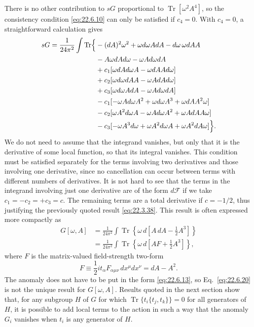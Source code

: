 There is no other contribution to $sG$ proportional to
$\operatorname{Tr}[\omega^2A^4]$, so the consistency condition
\eqref{eq:22.6.10} can only be satisfied if $c_4=0$. With $c_4=0$, a
straightforward calculation gives
\[
 \begin{aligned}
 sG=\frac{1}{24\pi^2}\int\operatorname{Tr}\Bigl\{
 &-(dA)^2\omega^2+\omega d\omega A dA-d\omega\,\omega dA A
 \\
 &-A\omega dA d\omega-\omega A d\omega dA
 \\
 &+c_1[\omega dA d\omega A-\omega dA A d\omega]
 \\
 &+c_2[\omega d\omega dA A-\omega A dA d\omega]
 \\
 &+c_3[\omega d\omega A dA-\omega A d\omega dA]
 \\
 &-c_1[-\omega A d\omega A^2+\omega d\omega A^3
       +\omega dA A^2\omega]
 \\
 &-c_2[\omega A^2d\omega A-\omega A d\omega A^2
       +\omega A dA A\omega]
 \\
 &-c_3[-\omega A^3d\omega+\omega A^2d\omega A
       +\omega A^2dA\omega]\Bigr\}.
 \end{aligned}
\]
We do not need to assume that the integrand vanishes, but only that it is
the derivative of some local function, so that its integral vanishes. This
condition must be satisfied separately for the terms involving two
derivatives and those involving one derivative, since no cancellation can
occur between terms with different numbers of derivatives. It is not hard
to see that the terms in the integrand involving just one derivative are
of the form $d\mathcal F$ if we take
$c_1=-c_2=+c_3=c$. The remaining terms are a total derivative if
$c=-1/2$, thus justifying the previously quoted result
\eqref{eq:22.3.38}. This result is often expressed more compactly as
\begin{equation}
 \begin{aligned}
 G[\omega,A]
 &=\frac{1}{24\pi^2}\int
 \operatorname{Tr}\left\{\omega\,d\left[
 A\,dA-\frac12A^3\right]\right\}
 \\
 &=\frac{1}{24\pi^2}\int
 \operatorname{Tr}\left\{\omega\,d\left[
 AF+\frac12A^3\right]\right\},
 \end{aligned}
 \tag{22.6.20}\label{eq:22.6.20}
\end{equation}
where $F$ is the matrix-valued field-strength two-form
\begin{equation}
 F\equiv\frac12 it_\alpha F_{\alpha\mu\nu}\,dx^\mu dx^\nu
 =dA-A^2.
 \tag{22.6.21}\label{eq:22.6.21}
\end{equation}
The anomaly does not have to be put in the form \eqref{eq:22.6.13}, so
Eq.~\eqref{eq:22.6.20} is not the unique result for $G[\omega,A]$. Results
quoted in the next section show that, for any subgroup $H$ of $G$ for
which $\operatorname{Tr}\{t_i\{t_j,t_k\}\}=0$ for all generators of $H$,
it is possible to add local terms to the action in such a way that the
anomaly $G_i$ vanishes when $t_i$ is any generator of $H$.

